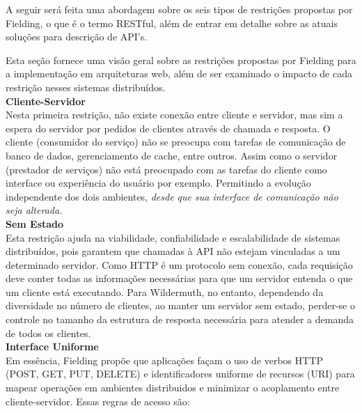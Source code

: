 A seguir será feita uma abordagem sobre os seis tipos de restrições propostas por Fielding, o que é o termo RESTful, além de entrar em detalhe sobre as atuais soluções para descrição de API's.

Esta seção fornece uma visão geral sobre as restrições propostas por Fielding para a implementação em arquiteturas web, além de ser examinado o impacto de cada restrição nesses sistemas distribuídos. \\

\textbf{Cliente-Servidor} \\

Nesta primeira restrição, não existe conexão entre cliente e servidor, mas sim a espera do servidor por pedidos de clientes através de chamada e resposta. O cliente (consumidor do serviço) não se preocupa com tarefas de comunicação de banco de dados, gerenciamento de cache, entre outros. Assim como o servidor (prestador de serviços) não está preocupado com as tarefas do cliente como interface ou experiência do usuário por exemplo. Permitindo a evolução independente dos dois ambientes, \textit{desde que sua interface de comunicação não seja alterada}. \cite{Fielding2000} \\

\textbf{Sem Estado} \\

Esta restrição ajuda na viabilidade, confiabilidade e escalabilidade de sistemas distribuídos, pois garantem que chamadas à API não estejam vinculadas a um determinado servidor. Como HTTP é um protocolo sem conexão, cada requisição deve conter todas as informações necessárias para que um servidor entenda o que um cliente está executando. Para Wildermuth, no entanto, dependendo da diversidade no número de clientes, ao manter um servidor sem estado, perder-se o controle no tamanho da estrutura de resposta necessária para atender a demanda de todos os clientes. \cite{Wildermuth2015} \\

\textbf{Interface Uniforme} \\

Em essência, Fielding propõe que aplicações façam o uso de verbos HTTP (POST, GET, PUT, DELETE) e identificadores uniforme de recursos (URI) para mapear operações em ambientes distribuidos e minimizar o acoplamento entre cliente-servidor. Essas regras de acesso são: \cite{Fielding2000}

